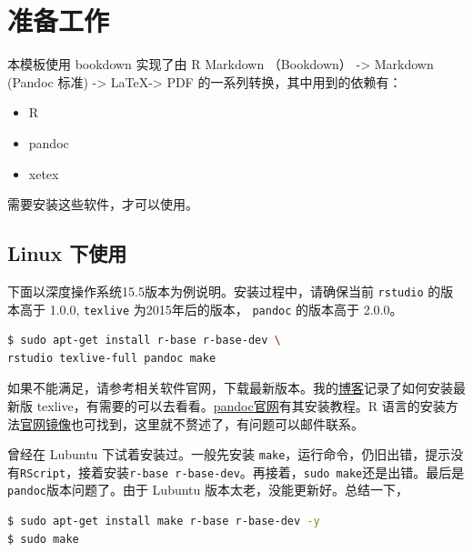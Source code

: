 \documentclass[doctor,openright,twoside]{sjtuthesis}
\providecommand{\tightlist}{%
    \setlength{\itemsep}{0pt}\setlength{\parskip}{0pt}}
\newcommand{\passthrough}[1]{#1}
\theoremstyle{plain}
\theoremstyle{definition}
\theoremstyle{remark}
\theoremstyle{ocrenumbox}
\theoremstyle{plain}
\begin{document}
\hypertarget{section-141}{%
\section{准备工作}\label{section-141}}

本模板使用 bookdown 实现了由 R Markdown （Bookdown） -\textgreater{} Markdown (Pandoc 标准) -\textgreater{} \LaTeX -\textgreater{} PDF 的一系列转换，其中用到的依赖有：

\begin{itemize}
\tightlist
\item
  R
\item
  pandoc
\item
  xetex
\end{itemize}

需要安装这些软件，才可以使用。

\hypertarget{linux--1}{%
\subsection{Linux 下使用}\label{linux--1}}

下面以深度操作系统15.5版本为例说明。安装过程中，请确保当前 \passthrough{\lstinline!rstudio!} 的版本高于 1.0.0, \passthrough{\lstinline!texlive!} 为2015年后的版本， \passthrough{\lstinline!pandoc!} 的版本高于 2.0.0。

\begin{lstlisting}[language=bash, numbers=none]
$ sudo apt-get install r-base r-base-dev \
rstudio texlive-full pandoc make
\end{lstlisting}

如果不能满足，请参考相关软件官网，下载最新版本。我的\href{https://my.oschina.net/bubifengyun/blog/1936119}{博客}记录了如何安装最新版 texlive，有需要的可以去看看。\href{https://github.com/jgm/pandoc/blob/master/INSTALL.md}{pandoc官网}有其安装教程。R 语言的安装方法\href{https://mirrors.tuna.tsinghua.edu.cn/CRAN/}{官网镜像}也可找到，这里就不赘述了，有问题可以邮件联系。

曾经在 Lubuntu 下试着安装过。一般先安装 \passthrough{\lstinline!make!}，运行命令，仍旧出错，提示没有\passthrough{\lstinline!RScript!}，接着安装\passthrough{\lstinline!r-base r-base-dev!}。再接着，\passthrough{\lstinline!sudo make!}还是出错。最后是\passthrough{\lstinline!pandoc!}版本问题了。由于 Lubuntu 版本太老，没能更新好。总结一下，

\begin{lstlisting}[language=bash, numbers=none]
$ sudo apt-get install make r-base r-base-dev -y
$ sudo make
\end{lstlisting}
\end{document}
